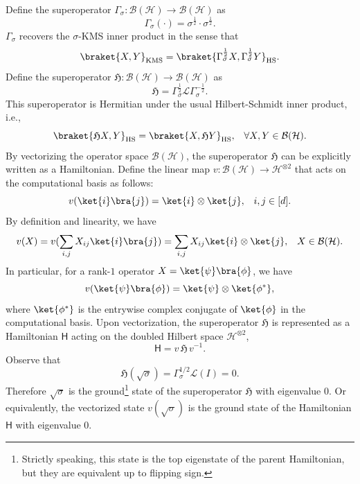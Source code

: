 \documentclass{article}
\theoremstyle{plain}
\theoremstyle{plain}
\theoremstyle{plain}
\theoremstyle{plain}
\theoremstyle{plain}
\theoremstyle{plain}
\theoremstyle{plain}
\newcommand{\calL}{\ensuremath{\mathcal{L}}}
\newcommand{\sfH}{\ensuremath{\mathsf{H}}}
\newcommand{\calB}{\ensuremath{\mathcal{B}}}
\newcommand{\calH}{\ensuremath{\mathcal{H}}}
\newcommand{\frakH}{\ensuremath{\mathfrak{H}}}
\begin{document}
Define the superoperator $\Gamma_\sigma: \calB(\calH) \to \calB(\calH)$ as
\begin{equation}
    \label{eq:gamma_sigma_def}
    \Gamma_\sigma (\cdot) = \sigma^{\frac{1}{2}} \cdot \sigma^{\frac{1}{2}}.
\end{equation}
$\Gamma_\sigma$ recovers the $\sigma$-KMS inner product in the sense that
\begin{equation}
    \braket{X,Y}_{\mathrm{KMS}} = \braket{\Gamma_\sigma^\frac{1}{2} X, \Gamma_\sigma^\frac{1}{2} Y}_{\mathrm{HS}}.
\end{equation}
Define the superoperator $\frakH: \calB(\calH) \to \calB(\calH)$ as 
\begin{equation}
    \frakH = \Gamma_\sigma^\frac{1}{2} \calL \Gamma_\sigma^{-\frac{1}{2}}.
\end{equation}
This superoperator is Hermitian under the usual Hilbert-Schmidt inner product, i.e., 
\begin{equation}
     \braket{\frakH X, Y}_{\mathrm{HS}} = \braket{X, \frakH Y}_{\mathrm{HS}}, \;\;\; \forall X,Y \in \calB(\calH).
\end{equation}
By vectorizing the operator space $\calB(\calH)$, the superoperator $\frakH$ can be explicitly written as a Hamiltonian. Define the linear map $v : \calB(\calH) \to \calH^{\otimes 2}$ that acts on the computational basis as follows:
\begin{equation}
    v (\ket{i} \bra{j}) = \ket{i} \otimes \ket{j}, \;\;\; i,j \in [d].
\end{equation}
By definition and linearity, we have
\begin{equation}
    v(X) = v(\sum_{i,j} X_{ij} \ket{i} \bra{j}) = \sum_{i,j} X_{ij} \ket{i} \otimes \ket{j}, \;\;\; X \in \calB(\calH).
\end{equation}
In particular, for a rank-$1$ operator $X = \ket{\psi} \bra{\phi}$, we have
\begin{equation}
    v(\ket{\psi} \bra{\phi}) = \ket{\psi} \otimes \ket{\phi^*},
\end{equation} where $\ket{\phi^*}$ is the entrywise complex conjugate of $\ket{\phi}$ in the computational basis.
Upon vectorization, the superoperator $\frakH$ is represented as a Hamiltonian $\sfH$ acting on the doubled Hilbert space $\calH^{\otimes 2}$,
\begin{equation}\label{eq:superoperator_vectorization}
    \sfH = v \, \frakH \, v^{-1}.
\end{equation}
Observe that
\begin{equation}
    \frakH(\sqrt{\sigma}) = \Gamma_\sigma^{1/2} \calL (I) = 0.
\end{equation} Therefore $\sqrt{\sigma}$ is the ground\footnote{Strictly speaking, this state is the top eigenstate of the parent Hamiltonian, but they are equivalent up to flipping sign.} state of the superoperator $\frakH$ with eigenvalue $0$. Or equivalently, the vectorized state $v(\sqrt{\sigma})$ is the ground state of the Hamiltonian $\sfH$ with eigenvalue $0$.
\end{document}
